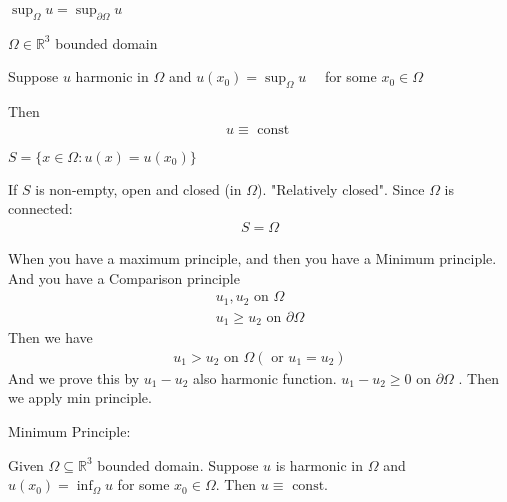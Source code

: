 \documentclass[11pt]{article}
\begin{document}
\begin{remark}
    $\sup_{\Omega} u = \sup_{\partial \Omega} u $
\end{remark}
\begin{corollary}
    $\Omega \in \mathbb{R}^{3}$ bounded domain

    Suppose $u$ harmonic in $\Omega$ and $u(x_0) = \sup_{\Omega}u \quad $ for some $x_0 \in \Omega$

    Then 
    \begin{align*}
        u \equiv \text{ const }
    \end{align*} 
\end{corollary}
\begin{remark}
    $S = \{ x \in \Omega: u(x) = u(x_0) \}$
\end{remark}
If $S$ is non-empty, open and closed (in $\Omega$). "Relatively closed".
Since $\Omega$ is connected:
\begin{align*}
    S = \Omega
\end{align*}
\begin{remark}
    When you have a maximum principle, and then you have a Minimum principle. And you have a
    Comparison principle
    \begin{align*}
        u_1,u_2 \text{ on } \Omega\\
        u_1 \ge u_2 \text{ on } \partial \Omega
    \end{align*}
    Then we have
    \begin{align*}
        u_1 > u_2 \text{ on } \Omega (\text{ or } u_1 = u_2)
    \end{align*}
    And we prove this by $u_1 - u_2$ also harmonic function. $u_1 - u_2 \ge 0$ on $\partial \Omega$
    . Then we apply min principle.
\end{remark}


Minimum Principle:

Given $\Omega \subseteq \mathbb{R}^{3}$ bounded domain. Suppose $u$ is harmonic in $\Omega$ and 
$u(x_0) = \inf_{\Omega}u$ for some $x_0 \in \Omega$. Then $u \equiv \text{ const}$.
\end{document}
